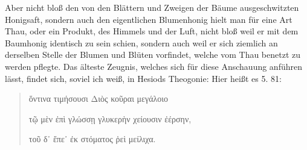 \documentclass[a4paper, 11pt, oneside]{article}
\begin{document}
Aber nicht bloß den von den Blättern und Zweigen der Bäume ausgeschwitzten Honigsaft, sondern auch den eigentlichen Blumenhonig hielt man für eine Art Thau, oder ein Produkt, des Himmels und der Luft, nicht bloß weil er mit dem Baumhonig identisch zu sein schien, sondern auch weil er sich ziemlich an derselben Stelle der Blumen und Blüten vorfindet, welche vom Thau benetzt zu werden pflegte. Das älteste Zeugnis, welches sich für diese Anschauung anführen lässt, findet sich, soviel ich weiß, in Hesiods Theogonie: Hier heißt es 5. 81:
\begin{quotation}
ὅντινα τιμήσουσι Διὸς κοῦραι μεγάλοιο

τῷ μὲν ἐπὶ γλώσσῃ γλυκερὴν χείουσιν ἐέρσην,

τοῦ δ᾽ ἔπε᾽ ἐκ στόματος ῥεὶ μείλιχα.
\end{quotation}
\paragraph{}
\end{document}
